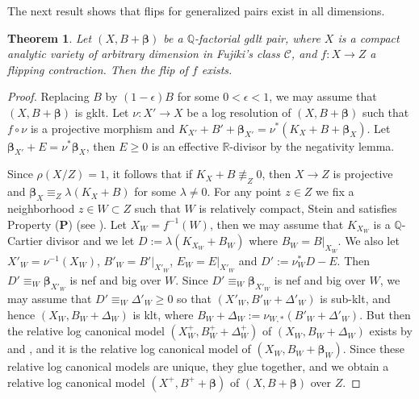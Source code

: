 \documentclass[12pt]{amsart}
\theoremstyle{plain}
\newtheorem{theorem}{Theorem}[section]
\theoremstyle{remark}
\theoremstyle{definition}
\newcommand{\<}{\leq}
\newcommand{\mbQ}{\mathbb{Q}}
\newcommand{\mbR}{\mathbb{R}}
\newcommand{\Q}{{\mathbb{Q}}}
\def\mcC{\mathcal{C}}
\def\bbeta{\boldsymbol{\beta}}
\theoremstyle{definition}
\theoremstyle{definition}
\numberwithin{equation}{section}
\theoremstyle{remark}
\begin{document}
The next result shows that flips for generalized pairs exist in all dimensions.
\begin{theorem}\label{t-flip}
Let $(X,B+\bbeta)$ be a $\mbQ$-factorial gdlt pair, where $X$ is a compact analytic variety of arbitrary dimension in Fujiki's class $\mcC$, and $f:X\to Z$ a flipping contraction. Then the flip of $f$ exists. 
\end{theorem}
\begin{proof} 
Replacing $B$ by $(1-\epsilon)B$ for some $0<\epsilon<1$, we may assume that $(X,B+\bbeta )$ is gklt. Let $\nu :X'\to X$ be a log resolution of $(X,B+\bbeta )$ such that $f\circ\nu$ is a projective morphism and $K_{X'}+B'+\bbeta_{X'}=\nu^*(K_X+B+\bbeta_X)$.
Let $\bbeta _{X'}+E=\nu ^*\bbeta _X$, then $E\geq 0$ is an effective $\mbR$-divisor by the negativity lemma.

Since $\rho (X/Z)=1$, it follows that if $K_X+B\not \equiv _Z0$, then $X\to Z$ is projective and $\bbeta _X\equiv _Z \lambda (K_X+B)$
for some $\lambda \ne 0$. For any point $z\in Z$ we fix a neighborhood $z\in W\subset Z$ such that $W$ is relatively compact, Stein and satisfies Property ({\bf P}) (see \cite[Definition 2.17 and Remark 2.18]{DHY23}). Let $X_W=f^{-1}(W)$, then we may assume that $K_{X_W}$
is a $\Q$-Cartier divisor and we let $D:=\lambda (K_{X_W}+B_W)$ where $B_W=B|_{X_W}$. We also let $X'_W=\nu ^{-1}(X_W)$, $B'_W=B'|_{X'_W}$, $E_W=E|_{X'_W}$ and $D':=\nu _W ^*D-E$. Then $D'\equiv_W \bbeta _{X'_W}$ is nef and big over $W$. Since $D'\equiv_W \bbeta _{X'_W}$ is nef and big over $W$, we may assume that $D'\equiv_W \Delta' _W\geq 0$ so that $(X'_W,B'_W+\Delta '_W)$ is sub-klt, and hence $(X_W,B_W+\Delta _W)$ is klt, where $B_W+\Delta_W:=\nu _{W,*}(B'_W+\Delta '_W)$. But then the relative log canonical model $(X^+_W,B^+_W+\Delta^+ _W)$ of $(X_W,B_W+\Delta _W)$ exists by \cite[Theorem 1.3]{DHP22} and \cite[Theorem 1.8]{Fuj22}, and it is the relative log canonical model of $(X_W,B_W+\bbeta _W)$. Since these relative log canonical models are unique, they glue together, and we obtain a relative log canonical model $(X^+,B^++\bbeta )$ of $(X,B+\bbeta )$ over $Z$. 


\end{proof}
\end{document}
